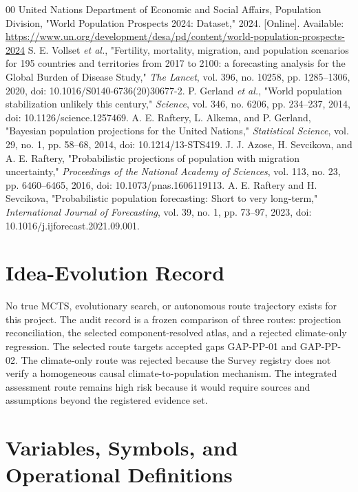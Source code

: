 \documentclass[conference]{IEEEtran}
\begin{document}
\begin{thebibliography}{00}
 United Nations Department of Economic and Social Affairs, Population Division, "World Population Prospects 2024: Dataset," 2024. [Online]. Available: \url{https://www.un.org/development/desa/pd/content/world-population-prospects-2024}
 S. E. Vollset \textit{et al.}, "Fertility, mortality, migration, and population scenarios for 195 countries and territories from 2017 to 2100: a forecasting analysis for the Global Burden of Disease Study," \textit{The Lancet}, vol. 396, no. 10258, pp. 1285--1306, 2020, doi: 10.1016/S0140-6736(20)30677-2.
 P. Gerland \textit{et al.}, "World population stabilization unlikely this century," \textit{Science}, vol. 346, no. 6206, pp. 234--237, 2014, doi: 10.1126/science.1257469.
 A. E. Raftery, L. Alkema, and P. Gerland, "Bayesian population projections for the United Nations," \textit{Statistical Science}, vol. 29, no. 1, pp. 58--68, 2014, doi: 10.1214/13-STS419.
 J. J. Azose, H. Sevcikova, and A. E. Raftery, "Probabilistic projections of population with migration uncertainty," \textit{Proceedings of the National Academy of Sciences}, vol. 113, no. 23, pp. 6460--6465, 2016, doi: 10.1073/pnas.1606119113.
 A. E. Raftery and H. Sevcikova, "Probabilistic population forecasting: Short to very long-term," \textit{International Journal of Forecasting}, vol. 39, no. 1, pp. 73--97, 2023, doi: 10.1016/j.ijforecast.2021.09.001.
\end{thebibliography}

\appendices

\section{Idea-Evolution Record}

No true MCTS, evolutionary search, or autonomous route trajectory exists for this project. The audit record is a frozen comparison of three routes: projection reconciliation, the selected component-resolved atlas, and a rejected climate-only regression. The selected route targets accepted gaps GAP-PP-01 and GAP-PP-02. The climate-only route was rejected because the Survey registry does not verify a homogeneous causal climate-to-population mechanism. The integrated assessment route remains high risk because it would require sources and assumptions beyond the registered evidence set.

\section{Variables, Symbols, and Operational Definitions}
\end{document}
